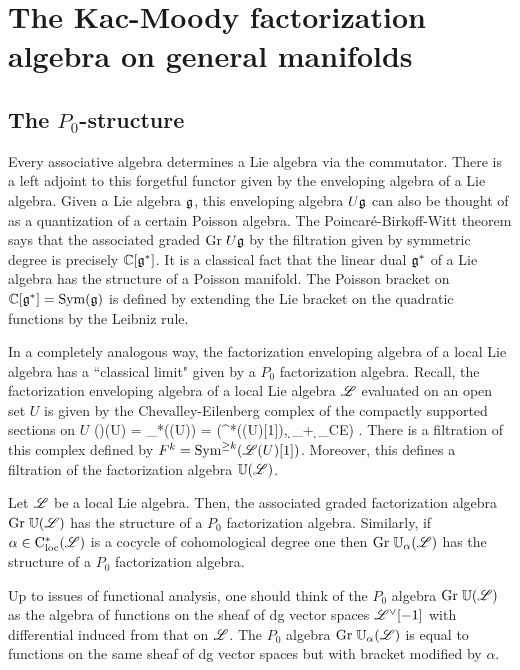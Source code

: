 \documentclass[10pt]{amsart}
\begin{document}
\section{The Kac-Moody factorization algebra on general manifolds}

\subsection{The $P_0$-structure}

Every associative algebra determines a Lie algebra via the commutator. 
There is a left adjoint to this forgetful functor given by the enveloping algebra of a Lie algebra. 
Given a Lie algebra $\mathfrak g$, this enveloping algebra $U \mathfrak g$ can also be thought of as a quantization of a certain Poisson algebra.
The Poincar\'{e}-Birkoff-Witt theorem says that the associated graded ${\rm Gr} \; U \mathfrak g$ by the filtration given by symmetric degree is precisely $\mathbb C[\mathfrak g^*]$.
It is a classical fact that the linear dual $\mathfrak g^*$ of a Lie algebra has the structure of a Poisson manifold. 
The Poisson bracket on $\mathbb C[\mathfrak g^*] = {\rm Sym}(\mathfrak g)$ is defined by extending the Lie bracket on the quadratic functions by the Leibniz rule. 

In a completely analogous way, the factorization enveloping algebra of a local Lie algebra has a ``classical limit" given by a $P_0$ factorization algebra. 
Recall, the factorization enveloping algebra of a local Lie algebra $\mathscr L$ evaluated on an open set $U$ is given by the Chevalley-Eilenberg complex of the compactly supported sections on $U$
\ben
\UU(\sL)(U) = \clieu_*(\sL(U)) = \left(\Sym^*(\sL(U)[1]), \d_\sL + \d_{CE}\right) .
\een
There is a filtration of this complex defined by $F^k = {\rm Sym}^{\geq k} (\mathscr L (U)[1])$. 
Moreover, this defines a filtration of the factorization algebra $\mathbb U(\mathscr L)$. 

\begin{lem} Let $\mathscr L$ be a local Lie algebra. 
Then, the associated graded factorization algebra ${\rm Gr} \; \mathbb U(\mathscr L)$ has the structure of a $P_0$ factorization algebra. 
Similarly, if $\alpha \in {\rm C}_{\rm loc}^*(\mathscr L)$ is a cocycle of cohomological degree one then ${\rm Gr} \; \mathbb U_\alpha(\mathscr L)$ has the structure of a $P_0$ factorization algebra.
\end{lem}

Up to issues of functional analysis, one should think of the $P_0$ algebra ${\rm Gr} \; \mathbb U(\mathscr L)$ as the algebra of functions on the sheaf of dg vector spaces $\mathscr L^\vee [-1]$ with differential induced from that on $\mathscr L$. 
The $P_0$ algebra ${\rm Gr} \; \mathbb U_\alpha(\mathscr L)$ is equal to functions on the same sheaf of dg vector spaces but with bracket modified by $\alpha$. 
\end{document}
